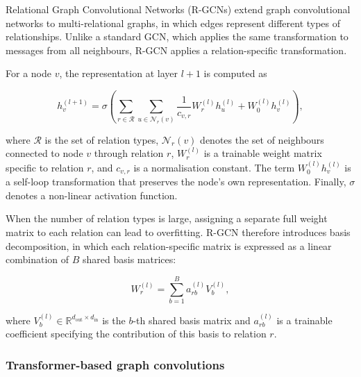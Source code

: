 Relational Graph Convolutional Networks (R-GCNs)
\cite{schlichtkrull2018modeling} extend graph convolutional networks to
multi-relational graphs, in which edges represent different types of
relationships.
Unlike a standard GCN, which applies the same transformation to messages
from all neighbours, R-GCN applies a relation-specific transformation.

For a node $v$, the representation at layer $l+1$ is computed as

\begin{equation}
\label{eq:rgcn}
h_v^{(l+1)} =
\sigma \left(
\sum_{r \in \mathcal{R}}
\sum_{u \in \mathcal{N}_r(v)}
\frac{1}{c_{v,r}}
W_r^{(l)} h_u^{(l)}
+
W_0^{(l)} h_v^{(l)}
\right),
\end{equation}

where $\mathcal{R}$ is the set of relation types,
$\mathcal{N}_r(v)$ denotes the set of neighbours connected to node $v$
through relation $r$, $W_r^{(l)}$ is a trainable weight matrix specific to
relation $r$, and $c_{v,r}$ is a normalisation constant.
The term $W_0^{(l)} h_v^{(l)}$ is a self-loop transformation that preserves
the node's own representation.
Finally, $\sigma$ denotes a non-linear activation function.

When the number of relation types is large, assigning a separate full weight
matrix to each relation can lead to overfitting.
R-GCN therefore introduces basis decomposition, in which each
relation-specific matrix is expressed as a linear combination of $B$ shared
basis matrices:

\begin{equation}
\label{eq:rgcn-basis}
W_r^{(l)} =
\sum_{b=1}^{B} a_{rb}^{(l)} V_b^{(l)},
\end{equation}

where $V_b^{(l)} \in
\mathbb{R}^{d_{\mathrm{out}} \times d_{\mathrm{in}}}$ is the $b$-th shared
basis matrix and $a_{rb}^{(l)}$ is a trainable coefficient specifying the
contribution of this basis to relation $r$.

\subsubsection{Transformer-based graph convolutions}

